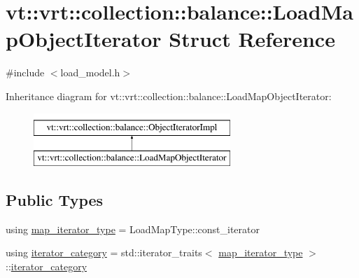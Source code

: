 \hypertarget{structvt_1_1vrt_1_1collection_1_1balance_1_1_load_map_object_iterator}{}\section{vt\+:\+:vrt\+:\+:collection\+:\+:balance\+:\+:Load\+Map\+Object\+Iterator Struct Reference}
\label{structvt_1_1vrt_1_1collection_1_1balance_1_1_load_map_object_iterator}


{\ttfamily \#include $<$load\+\_\+model.\+h$>$}

Inheritance diagram for vt\+:\+:vrt\+:\+:collection\+:\+:balance\+:\+:Load\+Map\+Object\+Iterator\+:\begin{figure}[H]
\begin{center}
\leavevmode
\includegraphics[height=2.000000cm]{structvt_1_1vrt_1_1collection_1_1balance_1_1_load_map_object_iterator}
\end{center}
\end{figure}
\subsection*{Public Types}
\begin{DoxyCompactItemize}
\item 
using \hyperlink{structvt_1_1vrt_1_1collection_1_1balance_1_1_load_map_object_iterator_ae487f542c8875bc4cd60da54da5545ce}{map\+\_\+iterator\+\_\+type} = Load\+Map\+Type\+::const\+\_\+iterator
\item 
using \hyperlink{structvt_1_1vrt_1_1collection_1_1balance_1_1_load_map_object_iterator_aa2d73306ea28e7f249a28d40dc963fdb}{iterator\+\_\+category} = std\+::iterator\+\_\+traits$<$ \hyperlink{structvt_1_1vrt_1_1collection_1_1balance_1_1_load_map_object_iterator_ae487f542c8875bc4cd60da54da5545ce}{map\+\_\+iterator\+\_\+type} $>$\+::\hyperlink{structvt_1_1vrt_1_1collection_1_1balance_1_1_load_map_object_iterator_aa2d73306ea28e7f249a28d40dc963fdb}{iterator\+\_\+category}
\end{DoxyCompactItemize}
